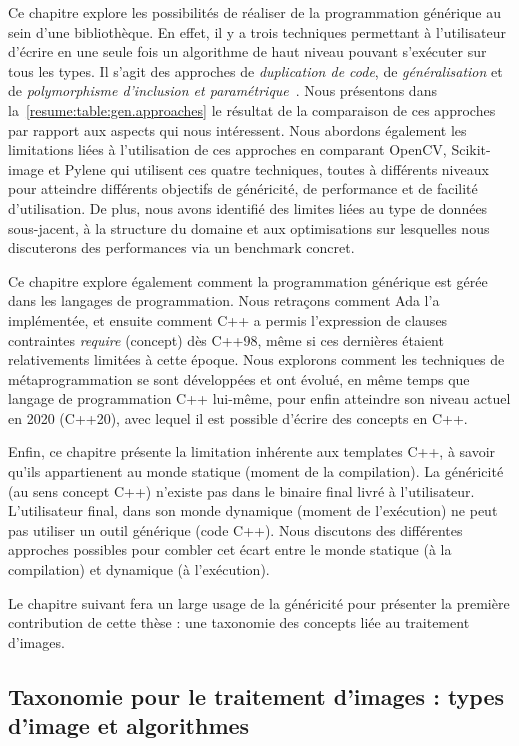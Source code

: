 Ce chapitre explore les possibilités de réaliser de la programmation générique au sein d'une bibliothèque. En effet, il
y a trois techniques permettant à l'utilisateur d'écrire en une seule fois un algorithme de haut niveau pouvant
s'exécuter sur tous les types. Il s'agit des approches de \emph{duplication de code}, de \emph{généralisation} et de
\emph{polymorphisme d'inclusion et paramétrique}~\parencite{gibbons.2007.datatype}. Nous présentons dans
la~\cref{resume:table:gen.approaches} le résultat de la comparaison de ces approches par rapport aux aspects qui nous
intéressent. Nous abordons également les limitations liées à l'utilisation de ces approches en comparant OpenCV,
Scikit-image et Pylene qui utilisent ces quatre techniques, toutes à différents niveaux pour atteindre différents
objectifs de généricité, de performance et de facilité d'utilisation. De plus, nous avons identifié des limites liées au
type de données sous-jacent, à la structure du domaine et aux optimisations sur lesquelles nous discuterons des
performances via un benchmark concret.

Ce chapitre explore également comment la programmation générique est gérée dans les langages de programmation. Nous
retraçons comment Ada l'a implémentée, et ensuite comment C++ a permis l'expression de clauses contraintes
\emph{require} (concept) dès C++98, même si ces dernières étaient relativements limitées à cette époque. Nous explorons
comment les techniques de métaprogrammation se sont développées et ont évolué, en même temps que langage de
programmation C++ lui-même, pour enfin atteindre son niveau actuel en 2020 (C++20), avec lequel il est possible d'écrire
des concepts en C++.

Enfin, ce chapitre présente la limitation inhérente aux templates C++, à savoir qu'ils appartienent au monde statique
(moment de la compilation). La généricité (au sens concept C++) n'existe pas dans le binaire final livré à
l'utilisateur. L'utilisateur final, dans son monde dynamique (moment de l'exécution) ne peut pas utiliser un outil
générique (code C++). Nous discutons des différentes approches possibles pour combler cet écart entre le monde statique
(à la compilation) et dynamique (à l'exécution).

Le chapitre suivant fera un large usage de la généricité pour présenter la première contribution de cette thèse : une
taxonomie des concepts liée au traitement d'images.


\subsection*{Taxonomie pour le traitement d'images : types d'image et algorithmes}


